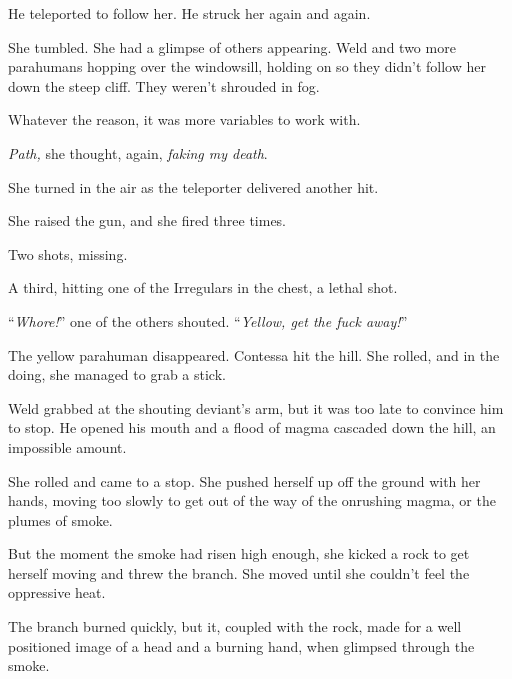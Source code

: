 He teleported to follow her.  He struck her again and again.



She tumbled.  She had a glimpse of others appearing.  Weld and two more parahumans hopping over the windowsill, holding on so they didn't follow her down the steep cliff.  They weren't shrouded in fog.



Whatever the reason, it was more variables to work with.



\emph{Path, }she thought, again, \emph{faking my death}.



She turned in the air as the teleporter delivered another hit.



She raised the gun, and she fired three times.



Two shots, missing.



A third, hitting one of the Irregulars in the chest, a lethal shot.



``\emph{Whore!}'' one of the others shouted.  ``\emph{Yellow, get the fuck away!}''



The yellow parahuman disappeared.  Contessa hit the hill.  She rolled, and in the doing, she managed to grab a stick.



Weld grabbed at the shouting deviant's arm, but it was too late to convince him to stop.  He opened his mouth and a flood of magma cascaded down the hill, an impossible amount.



She rolled and came to a stop.  She pushed herself up off the ground with her hands, moving too slowly to get out of the way of the onrushing magma, or the plumes of smoke.



But the moment the smoke had risen high enough, she kicked a rock to get herself moving and threw the branch.  She moved until she couldn't feel the oppressive heat.



The branch burned quickly, but it, coupled with the rock, made for a well positioned image of a head and a burning hand, when glimpsed through the smoke.




